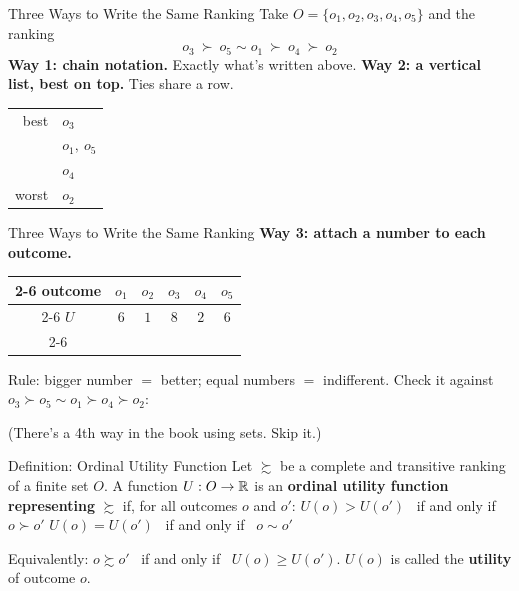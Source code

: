 \begin{frame}{Three Ways to Write the Same Ranking}
Take $O=\{o_1,o_2,o_3,o_4,o_5\}$ and the ranking
$$o_3\ \succ\ o_5\sim o_1\ \succ\ o_4\ \succ\ o_2$$
\bsk
\textbf{Way 1: chain notation.} Exactly what's written above.
\bsk
\textbf{Way 2: a vertical list, best on top.} Ties share a row.
\bsk
\centering
\begin{tabular}{rl}
best & $o_3$ \\
 & $o_1,\ o_5$ \\
 & $o_4$ \\
worst & $o_2$ \\
\end{tabular}
\vfill
\end{frame}

\begin{frame}{Three Ways to Write the Same Ranking}
\textbf{Way 3: attach a number to each outcome.}
\bsk
\centering
\begin{tabular}{c|c|c|c|c|c|}
\cline{2-6}
outcome & $o_1$ & $o_2$ & $o_3$ & $o_4$ & $o_5$ \\
\cline{2-6}
$U$ & $6$ & $1$ & $8$ & $2$ & $6$ \\
\cline{2-6}
\end{tabular}
\bsk
\raggedright
Rule: bigger number $=$ better; equal numbers $=$ indifferent.
\vfill
Check it against $o_3\succ o_5\sim o_1\succ o_4\succ o_2$: \vspace{0.7in}

(There's a 4th way in the book using sets. Skip it.)
\end{frame}

\begin{frame}{Definition: Ordinal Utility Function}
Let $\succsim$ be a complete and transitive ranking of a finite set $O$.
\bsk
A function $U:O\to\mathbb{R}$ is an \textbf{ordinal utility function representing} $\succsim$ if,
for all outcomes $o$ and $o'$:
\bsk
\centering
$U(o)>U(o')$ \ if and only if \ $o\succ o'$
\bsk
$U(o)=U(o')$ \ if and only if \ $o\sim o'$
\bsk
\raggedright
\vfill
Equivalently: \hspace{0.3in} $o\succsim o'$ \ if and only if \ $U(o)\ge U(o')$.
\bsk
$U(o)$ is called the \textbf{utility} of outcome $o$.
\end{frame}

